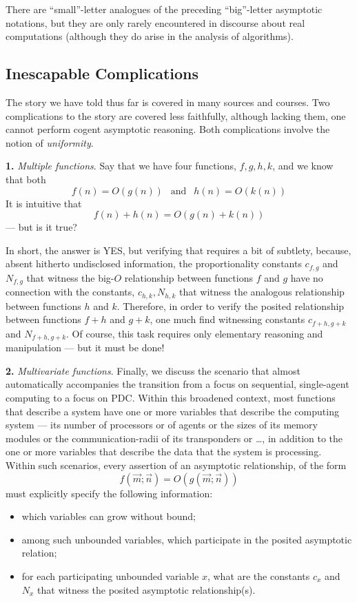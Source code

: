 \medskip

%
There are ``small''-letter analogues of the preceding ``big''-letter
asymptotic notations, but they are only rarely encountered in
discourse about real computations (although they do arise in the
analysis of algorithms).

\subsection{Inescapable Complications}
\label{sec:asymptotic-complication}

The story we have told thus far is covered in many sources and
courses.  Two complications to the story are covered less faithfully,
although lacking them, one cannot perform cogent asymptotic
reasoning.  Both complications involve the notion of {\em uniformity}.

\noindent
{\bf 1.}
{\em Multiple functions}.
%
Say that we have four functions, $f, g, h, k$, and we know that both
\[ f(n) = O(g(n)) \ \ \mbox{ and } \ \ h(n) = O(k(n)) \]
It is intuitive that
\[ f(n) + h(n) = O(g(n) + k(n)) \]
--- but is it true?

In short, the answer is YES, but verifying that requires a bit of
subtlety, because, absent hitherto undisclosed information, the
proportionality constants $c_{f,g}$ and $N_{f,g}$ that witness the
big-$O$ relationship between functions $f$ and $g$ have no connection
with the constants, $c_{h,k}, N_{h,k}$ that witness the analogous
relationship between functions $h$ and $k$.  Therefore, in order to
verify the posited relationship between functions $f + h$ and $g + k$,
one much find witnessing constants $c_{f+h, g+k}$ and $N_{f+h,g+k}$.
Of course, this task requires only elementary reasoning and
manipulation --- but it must be done!

{\bf 2.}
{\em Multivariate functions}.
%
Finally, we discuss the scenario that almost automatically accompanies
the transition from a focus on sequential, single-agent computing to a
focus on PDC.  Within this broadened context, most functions that
describe a system have one or more variables that describe the
computing system --- its number of processors or of agents or the
sizes of its memory modules or the communication-radii of its
transponders or \ldots, in addition to the one or more variables that
describe the data that the system is processing.  Within such
scenarios, every assertion of an asymptotic relationship, of the form
\[ f(\vec{m}; \vec{n}) = O(g(\vec{m}; \vec{n})) \]
must explicitly specify the following information:
\begin{itemize}
\item
which variables can grow without bound;
\item
among such unbounded variables, which participate in the posited
asymptotic relation;
\item
for each participating unbounded variable $x$, what are the constants
$c_x$ and $N_x$ that witness the posited asymptotic relationship(s).
\end{itemize}

